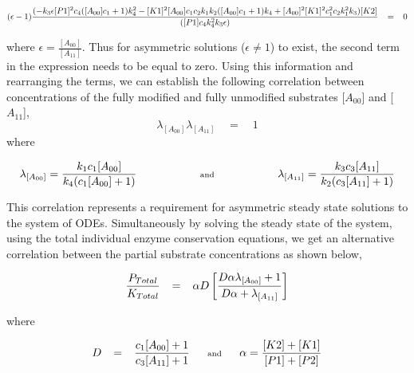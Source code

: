 \documentclass[9pt,lineno]{elife}
\begin{document}
\begin{appendixbox}
\begin{equation}
   \scriptsize{(\epsilon-1)\frac{(-k_3\epsilon[P1]^2c_4([A_{00}]c_1+1)k_4^2-[K1]^2[A_{00}]c_1c_2k_1k_2([A_{00}]c_1+1)k_4+[A_{00}]^2[K1]^2c_1^2c_2k_1^2k_3)[K2]}{([P1]c_4k_4^2k_3\epsilon)} \quad = \quad 0}
\end{equation}

where $\epsilon = \frac{[A_{00}]}{[A_{11}]}$. Thus for asymmetric solutions ($\epsilon \neq 1$) to exist, the second term in the expression needs to be equal to zero. Using this information and rearranging the terms, we can establish the following correlation between concentrations of the fully modified and fully unmodified substrates [$A_{00}$] and [$A_{11}$], $$\lambda_{[A_{00}]} \lambda_{[A_{11}]} \quad = \quad 1$$ where 

\begin{equation}
    \scriptsize{\lambda_{[A_{00}]} = \frac{k_1c_1[A_{00}]}{k_4(c_1[A_{00}]+1)} \hspace{20mm} \textrm{and} \hspace{20mm} \lambda_{[A_{11}]} = \frac{k_3c_3[A_{11}]}{k_2(c_3[A_{11}]+1)}}
    \label{Eqn: system3 case 2 - Asymm}
\end{equation}

This correlation represents a requirement for asymmetric steady state solutions to the system of ODEs. Simultaneously by solving the steady state of the system, using the total individual enzyme conservation equations, we get an alternative correlation between the partial substrate concentrations as shown below,

\begin{equation}
    \scriptsize{\frac{P_{Total}}{K_{Total}} \quad = \quad \alpha D \left[\frac{D\alpha\lambda_{[A_{00}]}+1}{D\alpha+\lambda_{[A_{11}]}}\right]}
    \label{Eqn: system3 case 2 - All}
\end{equation}

where 

\begin{equation}
    \scriptsize{D \quad = \quad \frac{c_1[A_{00}]+1}{c_3[A_{11}]+1} \qquad \textrm{and} \qquad \alpha = \frac{[K2] + [K1]}{[P1] + [P2]}}
\end{equation}


\end{appendixbox}
\end{document}
